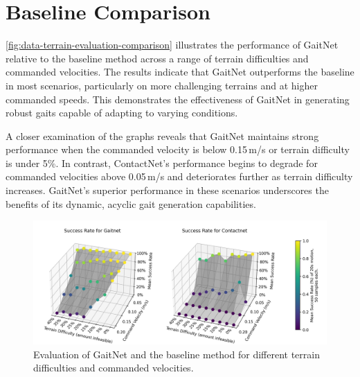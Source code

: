 \section{Baseline Comparison}

\autoref{fig:data-terrain-evaluation-comparison} illustrates the
performance of GaitNet relative to the baseline method across a range
of terrain difficulties and commanded velocities. The results
indicate that GaitNet outperforms the baseline in most scenarios,
particularly on more challenging terrains and at higher commanded
speeds. This demonstrates the effectiveness of GaitNet in generating
robust gaits capable of adapting to varying conditions.

A closer examination of the graphs reveals that GaitNet maintains
strong performance when the commanded velocity is below 0.15\,m/s or
terrain difficulty is under 5\%. In contrast, ContactNet's
performance begins to degrade for commanded velocities above
0.05\,m/s and deteriorates further as terrain difficulty increases.
GaitNet's superior performance in these scenarios underscores the
benefits of its dynamic, acyclic gait generation capabilities.

\begin{figure}[H]
  \centering
  \includegraphics[width=\textwidth]{images/data/terrain-evaluation-comparison.png}
  \caption{Evaluation of GaitNet and the baseline method for
  different terrain difficulties and commanded velocities.}
  \label{fig:data-terrain-evaluation-comparison}
\end{figure}
